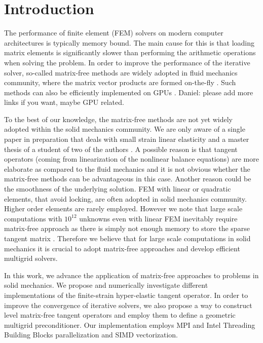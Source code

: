 \documentclass[preprint,12pt,times]{elsarticle}
\begin{document}
\section{Introduction}

The performance of finite element (FEM) solvers on modern computer architectures is typically memory bound.
The main cause for this is that loading matrix elements is significantly slower than performing the arithmetic operations when solving the problem.
In order to improve the performance of the iterative solver, so-called matrix-free methods are
widely adopted in fluid mechanics community, where the matrix vector products are formed on-the-fly \cite{kronbichler12,May2015, Krank2017, Brown2010, Gmeiner2016}. Such methods can also be efficiently implemented on GPUs \cite{Abdelfattah2016}.
{\color{red}Daniel: please add more links if you want, maybe GPU related}.

To the best of our knowledge, the matrix-free methods are not yet widely adopted within the solid mechanics community.
We are only aware of a single paper in preparation that deals with small strain linear elasticity \cite{Clevenger2018} and a master thesis of a student of two of the authors \cite{Mentler2017}.
A possible reason is that tangent operators (coming from linearization of the nonlinear balance equations) are
more elaborate as compared to the fluid mechanics and it is not obvious whether the matrix-free methods can be advantageous in this case. Another reason could be the smoothness of the underlying solution. FEM with linear or quadratic elements, that avoid locking, are often adopted in solid mechanics community. Higher order elements are rarely employed. However we note that large scale computations with $10^{12}$ unknowns even with linear FEM inevitably require matrix-free approach as there is simply not enough memory to store the sparse tangent matrix \cite{Gmeiner2016}. Therefore we believe that for large scale computations in solid mechanics it is crucial to adopt matrix-free approaches and develop efficient multigrid solvers.

In this work, we advance the application of matrix-free approaches to problems in solid mechanics.
We propose and numerically investigate different implementations of the finite-strain hyper-elastic tangent operator.
In order to improve the convergence of iterative solvers, we also propose a way to construct level matrix-free tangent operators
and employ them to define a geometric multigrid preconditioner.
Our implementation employs MPI and Intel Threading Building Blocks parallelization and SIMD vectorization.
\end{document}
